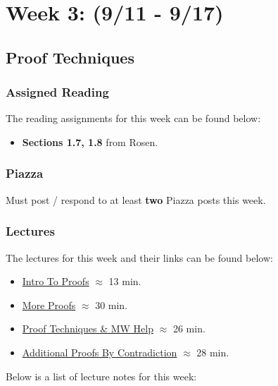 \clearpage
\chapter{Week 3: (9/11 - 9/17)}

\section{Proof Techniques}

\subsection{Assigned Reading}

The reading assignments for this week can be found below:

\begin{itemize}
    \item \textbf{Sections 1.7, 1.8} from Rosen.
\end{itemize}

\subsection{Piazza}

Must post / respond to at least \textbf{two} Piazza posts this week.  

\subsection{Lectures}

The lectures for this week and their links can be found below:

\begin{itemize}
    \item \href{https://drive.explaineverything.com/thecode/TREJHHM}{Intro To Proofs} $\approx$ 13 min.
    \item \href{https://drive.explaineverything.com/thecode/YNUCFDU}{More Proofs} $\approx$ 30 min.
    \item \href{https://drive.explaineverything.com/thecode/UAQXMXM}{Proof Techniques \& MW Help} $\approx$ 26 min.
    \item \href{https://applied.cs.colorado.edu/mod/hvp/view.php?id=51592}{Additional Proofs By Contradiction} $\approx$ 28 min.
\end{itemize}

\noindent Below is a list of lecture notes for this week:

